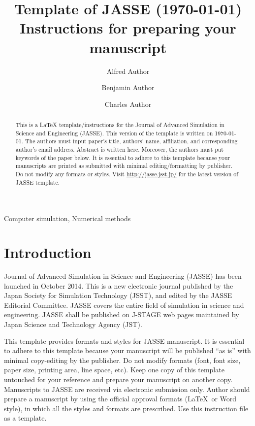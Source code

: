 \documentclass[journal]{jasse-modern}
\title{Template of JASSE (\today)\\ Instructions for preparing your manuscript}
\author[1,*]{Alfred Author}
\author[2,4]{Benjamin Author}
\author[3]{Charles Author}
\affil[1]{{Department of Simulation, School of Technology, Japan University}}
\affil[2]{{Affiliation 2}}
\affil[3]{{Affiliation 3}}
\affil[4]{{Affiliation 4}}
\begin{document}
\maketitle
\thispagestyle{titlepage}

\begin{abstract}
This is a {\LaTeX} template/instructions for the Journal of Advanced Simulation in Science and Engineering (JASSE).
This version of the template is written on \today.
The authors must input paper's title, authors' name, affiliation, and corresponding author's email address.
Abstract is written here.
Moreover, the authors must put keywords of the paper below.
It is essential to adhere to this template because your manuscripts are printed as
submitted with minimal editing/formatting by publisher.
Do not modify any formats or styles.
Visit \url{http://jasse.jsst.jp/} for the latest version of JASSE template.
\end{abstract}

\begin{keywords}
Computer simulation, Numerical methods
\end{keywords}

\section{Introduction}

Journal of Advanced Simulation in Science and Engineering (JASSE) has been launched in
October 2014. This is a new electronic journal published by the Japan Society for
Simulation Technology (JSST), and edited by the JASSE Editorial Committee. JASSE
covers the entire field of simulation in science and engineering. JASSE shall be published
on J-STAGE web pages maintained by Japan Science and Technology Agency (JST).

This template provides formats and styles for JASSE manuscript.
It is essential to adhere to this template because your manuscript will be published ``as is'' with minimal copy-editing by the publisher.
Do not modify formats (font, font size, paper size, printing area, line space, etc).
Keep one copy of this template untouched for your reference and prepare your manuscript on another copy.
Manuscripts to JASSE are received via electronic submission only.
Author should prepare a manuscript by using the official approval formats (\LaTeX~or Word style), in which all the styles and formats are prescribed.
Use this instruction file as a template.
\end{document}
